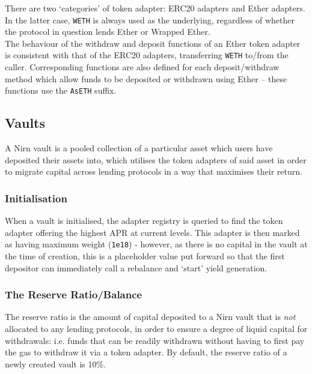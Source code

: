 \documentclass{article}
\begin{document}
\noindent
There are two `categories' of token adapter: ERC20 adapters and Ether adapters. In the latter case, \texttt{WETH} is always used as the underlying, regardless of whether the protocol in question lends Ether or Wrapped Ether.\\

\noindent
The behaviour of the withdraw and deposit functions of an Ether token adapter is consistent with that of the ERC20 adapters, transferring \texttt{WETH} to/from the caller. Corresponding functions are also defined for each deposit/withdraw method which allow funds to be deposited or withdrawn using Ether -- these functions use the \texttt{AsETH} suffix.

\subsection{Vaults}

A Nirn vault is a pooled collection of a particular asset which users have deposited their assets into, which utilises the token adapters of said asset in order to migrate capital across lending protocols in a way that maximises their return.

\subsubsection{Initialisation}

\noindent
When a vault is initialised, the adapter registry is queried to find the token adapter offering the highest APR at current levels. This adapter is then marked as having maximum weight (\texttt{1e18}) - however, as there is no capital in the vault at the time of creation, this is a placeholder value put forward so that the first depositor can immediately call a rebalance and `start' yield generation.

\subsubsection{The Reserve Ratio/Balance}

The reserve ratio is the amount of capital deposited to a Nirn vault that is \textit{not} allocated to any lending protocols, in order to ensure a degree of liquid capital for withdrawals: i.e. funds that can be readily withdrawn without having to first pay the gas to withdraw it via a token adapter. By default, the reserve ratio of a newly created vault is 10\%.\\
\end{document}
